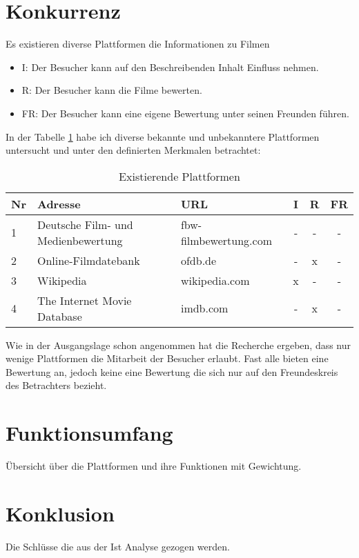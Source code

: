 \section{Konkurrenz}
Es existieren diverse Plattformen die Informationen zu Filmen

\begin{itemize}
    \item I: Der Besucher kann auf den Beschreibenden Inhalt Einfluss nehmen.
    \item R: Der Besucher kann die Filme bewerten. 
    \item FR: Der Besucher kann eine eigene Bewertung unter seinen Freunden führen.
\end{itemize}

In der Tabelle \ref{tab:plattformen} habe ich diverse bekannte und 
unbekanntere Plattformen untersucht und unter den definierten Merkmalen betrachtet:

\begin{table}[h]
\begin{center}
    \begin{tabular}{lllccc}
        \toprule Nr & Adresse & URL & I & R & FR \\
        \midrule 1 & Deutsche Film- und Medienbewertung & fbw-filmbewertung.com & - & - & - \\
        \midrule 2 & Online-Filmdatebank & ofdb.de & - & x & - \\
        \midrule 3 & Wikipedia & wikipedia.com & x & - & - \\
        \midrule 4 & The Internet Movie Database & imdb.com & - & x & - \\
        \bottomrule
    \end{tabular}
    \caption{Existierende Plattformen}
    \label{tab:plattformen}
\end{center}
\end{table}

Wie in der Ausgangslage schon angenommen hat die Recherche ergeben, dass nur
wenige Plattformen die Mitarbeit der Besucher erlaubt. Fast alle bieten
eine Bewertung an, jedoch keine eine Bewertung die sich nur auf den
Freundeskreis des Betrachters bezieht.

\section{Funktionsumfang}
Übersicht über die Plattformen und ihre Funktionen mit Gewichtung.

\section{Konklusion}
Die Schlüsse die aus der Ist Analyse gezogen werden.